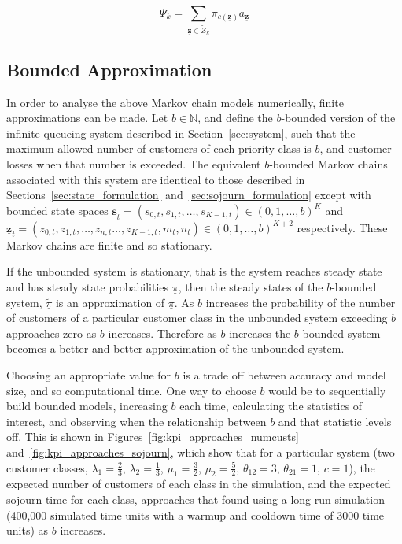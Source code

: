 \documentclass{article}
\begin{document}
\begin{equation}\label{eqn:mean_sojourn_class_k}
\Psi_k = \sum_{\underline{\mathbf{z}} \in \tilde{Z}_k} \pi_{c(\underline{\mathbf{z}})} a_{\underline{\mathbf{z}}}
\end{equation}



\subsection{Bounded Approximation}\label{sec:bound}
In order to analyse the above Markov chain models numerically, finite
approximations can be made. Let $b \in \mathbb{N}$, and define the $b$-bounded
version of the infinite queueing system described in Section~\ref{sec:system},
such that the maximum allowed number of customers of each priority class is $b$,
and customer losses when that number is exceeded. The equivalent $b$-bounded
Markov chains associated with this system are identical to those described in
Sections~\ref{sec:state_formulation} and~\ref{sec:sojourn_formulation} except
with bounded state spaces
$\underline{\mathbf{s}}_t = (s_{0,t}, s_{1,t}, \dots, s_{K-1,t}) \in (0, 1, \dots, b)^K$ and
$\underline{\mathbf{z}}_t = (z_{0,t}, z_{1,t}, \dots, z_{n,t} \dots, z_{K-1,t}, m_t, n_t) \in (0, 1, \dots, b)^{K+2}$
respectively. These Markov chains are finite and so stationary.

If the unbounded system is stationary, that is the system reaches steady state
and has steady state probabilities $\underline{\pi}$, then the steady states of
the $b$-bounded system, $\underline{\tilde{\pi}}$ is an approximation of
$\underline{\pi}$. As $b$ increases the probability of the number of
customers of a particular customer class in the unbounded system exceeding $b$
approaches zero as $b$ increases. Therefore as $b$ increases the $b$-bounded
system becomes a better and better approximation of the unbounded system.

Choosing an appropriate value for $b$ is a trade off between accuracy and model
size, and so computational time. One way to choose $b$ would be to
sequentially build bounded models, increasing $b$ each time, calculating the
statistics of interest, and observing when the relationship between $b$ and that
statistic levels off. This is shown in Figures~\ref{fig:kpi_approaches_numcusts}
and~\ref{fig:kpi_approaches_sojourn}, which show that for a particular system
(two customer classes, $\lambda_1=\frac{2}{3}$, $\lambda_2=\frac{1}{3}$,
$\mu_1=\frac{3}{2}$, $\mu_2=\frac{5}{2}$, $\theta_{12}=3$, $\theta_{21}=1$,
$c=1$), the expected number of customers of each class in the simulation, and
the expected sojourn time for each class, approaches that found using a long run
simulation (400,000 simulated time units with a warmup and cooldown time of 3000
time units) as $b$ increases.
\end{document}
